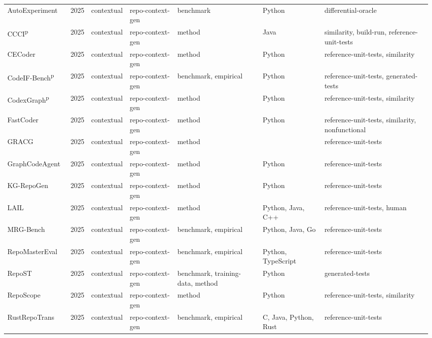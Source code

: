 {\begin{longtable}{@{}p{2.8cm}lllp{1.9cm}p{1.5cm}p{2.9cm}@{}}
AutoExperiment~\cite{AutoExperiment2025} & 2025 & contextual & repo-context-gen & benchmark & Python & differential-oracle \\
CCCI\textsuperscript{p}~\cite{CCCI2025} & 2025 & contextual & repo-context-gen & method & Java & similarity, build-run, reference-unit-tests \\
CECoder~\cite{CECoder2025} & 2025 & contextual & repo-context-gen & method & Python & reference-unit-tests, similarity \\
CodeIF-Bench\textsuperscript{p}~\cite{CodeIFBench2025} & 2025 & contextual & repo-context-gen & benchmark, empirical & Python & reference-unit-tests, generated-tests \\
CodexGraph\textsuperscript{p}~\cite{CodexGraph2025} & 2025 & contextual & repo-context-gen & method & Python & reference-unit-tests, similarity \\
FastCoder~\cite{FastCoder2025} & 2025 & contextual & repo-context-gen & method & Python & reference-unit-tests, similarity, nonfunctional \\
GRACG~\cite{GRACG2025} & 2025 & contextual & repo-context-gen & method &  & reference-unit-tests \\
GraphCodeAgent~\cite{GraphCodeAgent2025} & 2025 & contextual & repo-context-gen & method & Python & reference-unit-tests \\
KG-RepoGen~\cite{KGRepoGen2025} & 2025 & contextual & repo-context-gen & method & Python & reference-unit-tests \\
LAIL~\cite{LAIL2025} & 2025 & contextual & repo-context-gen & method & Python, Java, C++ & reference-unit-tests, human \\
MRG-Bench~\cite{MRGBench2025} & 2025 & contextual & repo-context-gen & benchmark, empirical & Python, Java, Go & reference-unit-tests \\
RepoMasterEval~\cite{RepoMasterEval2025} & 2025 & contextual & repo-context-gen & benchmark, empirical & Python, TypeScript & reference-unit-tests \\
RepoST~\cite{RepoST2025} & 2025 & contextual & repo-context-gen & benchmark, training-data, method & Python & generated-tests \\
RepoScope~\cite{RepoScope2025} & 2025 & contextual & repo-context-gen & method & Python & reference-unit-tests, similarity \\
RustRepoTrans~\cite{RustRepoTrans2025} & 2025 & contextual & repo-context-gen & benchmark, empirical & C, Java, Python, Rust & reference-unit-tests \\

\end{longtable}}

